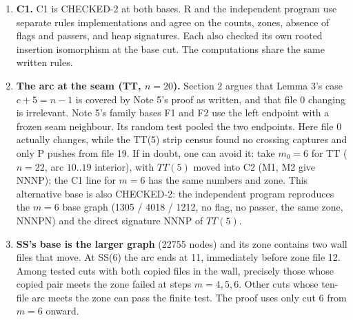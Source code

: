 \begin{enumerate}
\item \textbf{C1.} C1 is CHECKED-2 at both bases. R and the independent program use separate rules implementations and agree on the counts, zones, absence of flags and passers, and heap signatures. Each also checked its own rooted insertion isomorphism at the base cut. The computations share the same written rules.
\item \textbf{The arc at the seam (TT, $n=20$).} Section 2 argues that Lemma 3's case $c+5=n-1$ is covered by Note 5's proof as written, and that file 0 changing is irrelevant. Note 5's family bases F1 and F2 use the left endpoint with a frozen seam neighbour. Its random test pooled the two endpoints. Here file 0 actually changes, while the TT(5) strip census found no crossing captures and only P pushes from file 19. If in doubt, one can avoid it: take $m_0=6$ for TT ($n=22$, arc $10..19$ interior), with $TT(5)$ moved into C2 (M1, M2 give NNNP); the C1 line for $m=6$ has the same numbers and zone. This alternative base is also CHECKED-2: the independent program reproduces the $m=6$ base graph (1305 / 4018 / 1212, no flag, no passer, the same zone, NNNPN) and the direct signature NNNP of $TT(5)$.
\item \textbf{SS's base is the larger graph} (22755 nodes) and its zone contains two wall files that move. At SS(6) the arc ends at 11, immediately before zone file 12. Among tested cuts with both copied files in the wall, precisely those whose copied pair meets the zone failed at steps $m=4,5,6$. Other cuts whose ten-file arc meets the zone can pass the finite test. The proof uses only cut 6 from $m=6$ onward.
\end{enumerate}
